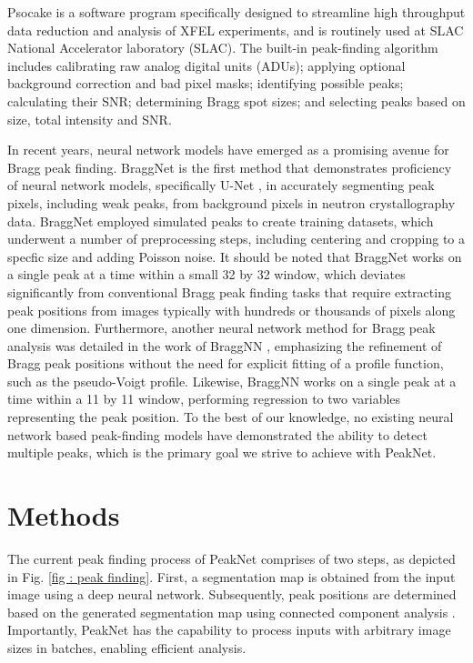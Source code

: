 \documentclass[a4paper]{article}
\newcommand{\peaknet}{PeakNet}
\newcommand{\psocake}{Psocake}
\begin{document}
\psocake{} is a software program specifically designed to streamline high throughput data reduction and analysis of XFEL experiments, and is routinely used at SLAC National Accelerator laboratory (SLAC).  The built-in peak-finding algorithm \citep{shinDataAnalysisUsing2018} includes calibrating raw analog digital units (ADUs); applying optional background correction and bad pixel masks; identifying possible peaks; calculating their SNR; determining Bragg spot sizes; and selecting peaks based on size, total intensity and SNR.

In recent years, neural network models have emerged as a promising avenue for Bragg peak finding.  BraggNet \citep{sullivanBraggNetIntegratingBragg2019} is the first method that demonstrates proficiency of neural network models, specifically U-Net \citep{ronnebergerUNetConvolutionalNetworks2015}, in accurately segmenting peak pixels, including weak peaks, from background pixels in neutron crystallography data.  BraggNet employed simulated peaks to create training datasets, which underwent a number of preprocessing steps, including centering and cropping to a specfic size and adding Poisson noise.  It should be noted that BraggNet works on a single peak at a time within a small 32 by 32 window, which deviates significantly from conventional Bragg peak finding tasks that require extracting peak positions from images typically with hundreds or thousands of pixels along one dimension.  Furthermore, another neural network method for Bragg peak analysis was detailed in the work of BraggNN \citep{liuBraggNNFastXray2021}, emphasizing the refinement of Bragg peak positions without the need for explicit fitting of a profile function, such as the pseudo-Voigt profile.  Likewise, BraggNN works on a single peak at a time within a 11 by 11 window, performing regression to two variables representing the peak position.  To the best of our knowledge, no existing neural network based peak-finding models have demonstrated the ability to detect multiple peaks, which is the primary goal we strive to achieve with \peaknet{}.


\section{Methods}

The current peak finding process of \peaknet{} comprises of two steps, as depicted in Fig. \ref{fig : peak finding}.  First, a segmentation map is obtained from the input image using a deep neural network.  Subsequently, peak positions are determined based on the generated segmentation map using connected component analysis \citep{weaverCentrosymmetricCrossSymmetricMatrices1985}.  Importantly, \peaknet{} has the capability to process inputs with arbitrary image sizes in batches, enabling efficient analysis.
\end{document}
